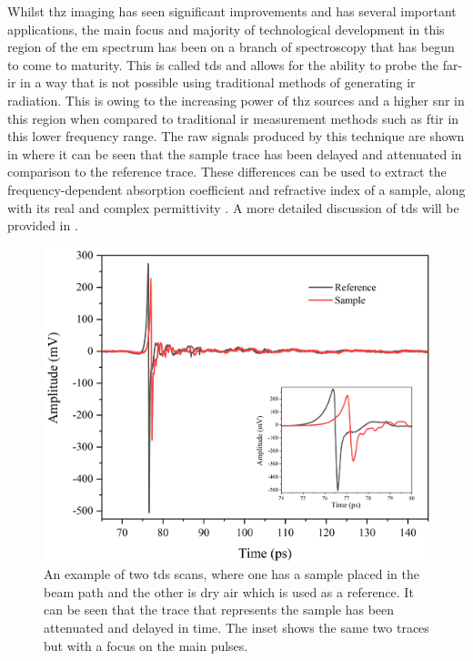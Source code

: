Whilst \acrshort{thz} imaging has seen significant improvements and has several important applications, the main focus and majority of technological development in this region of the \acrshort{em} spectrum has been on a branch of spectroscopy that has begun to come to maturity. This is called \acrfull{tds} and allows for the ability to probe the far\nobreakdash-\acrshort{ir} in a way that is not possible using traditional methods of generating \acrshort{ir} radiation. This is owing to the increasing power of \acrshort{thz} sources and a higher \acrfull{snr} in this region when compared to traditional \acrshort{ir} measurement methods such as \acrfull{ftir} in this lower frequency range. The raw signals produced by this technique are shown in  where it can be seen that the sample trace has been delayed and attenuated in comparison to the reference trace. These differences can be used to extract the frequency\nobreakdash-dependent absorption coefficient and refractive index of a sample, along with its real and complex permittivity \cite{Burnett2016}. A more detailed discussion of \acrshort{tds} will be provided in .

\begin{figure}[t]
    \centering
    \includegraphics[scale=0.6]{Figures/Misc/Theory/TimeDomainFigureG.png}
    \captionsetup{font = footnotesize, justification = centering}
    \caption[A Sample and Reference Measurement in the Time Domain]{An example of two \acrshort{tds} scans, where one has a sample placed in the beam path and the other is dry air which is used as a reference. It can be seen that the trace that represents the sample has been attenuated and delayed in time. The inset shows the same two traces but with a focus on the main pulses.}
    \label{fig:exampletd}
\end{figure}

